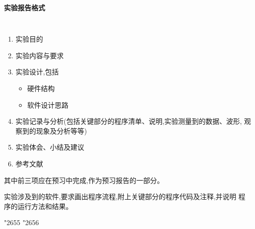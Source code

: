 \setcounter{chapter}{0}
\begin{center} \LARGE \bf \textsf{实验报告格式} \end{center}
\large \tt
\begin{enumerate}
  \item 实验目的
  \item 实验内容与要求
  \item 实验设计,包括
  \begin{itemize}
    \item 硬件结构
    \item 软件设计思路
  \end{itemize}
  \item 实验记录与分析(包括关键部分的程序清单、说明,实验测量到的数据、波形,
        观察到的现象及分析等等)
  \item 实验体会、小结及建议
  \item 参考文献
\end{enumerate}
其中前三项应在预习中完成,作为预习报告的一部分。

    实验涉及到的软件,要求画出程序流程,附上关键部分的程序代码及注释,并说明
程序的运行方法和结果。

\begin{center} \char"2655 \char"2656 \end{center}
\iffalse

    *实验提倡独立思考,鼓励创新钻研。教师在指导实验中可适当地配以示教,但不
提倡简单的``有问必答''。
  
    *学生实验结束,须经教师检查签字认可,并及时书写实验报告。实验报告应以原始
记录为依据,可在预习报告的基础上,增添整理实验纪录和分析、实验体会与小结。
实验报告应及时完成。
\fi
\rm\normalsize
